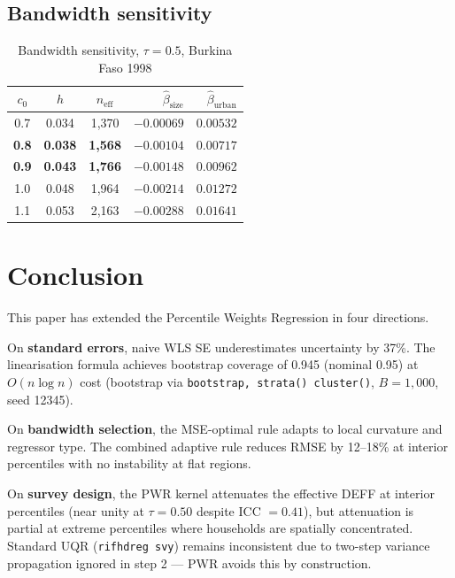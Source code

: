 \documentclass[12pt,a4paper]{article}
\theoremstyle{definition}
\begin{document}
\subsection{Bandwidth sensitivity}

\begin{table}[htbp]\centering\small
\caption{Bandwidth sensitivity, $\tau=0.5$, Burkina Faso 1998}
\label{tab:bw_sensitivity}
\begin{tabular}{cccrr}
\toprule
$c_0$ & $h$ & $n_{\mathrm{eff}}$ &
$\hat\beta_{\mathrm{size}}$ & $\hat\beta_{\mathrm{urban}}$\\\midrule
0.7&0.034&1{,}370&$-0.00069$&$0.00532$\\
\textbf{0.8}&\textbf{0.038}&\textbf{1{,}568}&$\mathbf{-0.00104}$&$\mathbf{0.00717}$\\
\textbf{0.9}&\textbf{0.043}&\textbf{1{,}766}
  &$\mathbf{-0.00148}$&$\mathbf{0.00962}$\\
1.0&0.048&1{,}964&$-0.00214$&$0.01272$\\
1.1&0.053&2{,}163&$-0.00288$&$0.01641$\\\bottomrule
\end{tabular}
\end{table}

\section{Conclusion}
\label{sec:conclusion}

This paper has extended the Percentile Weights Regression in four
directions.

On \textbf{standard errors}, naive WLS SE underestimates uncertainty
by 37\%. The linearisation formula achieves bootstrap coverage of
0.945 (nominal 0.95) at $O(n\log n)$ cost (bootstrap via \texttt{bootstrap, strata() cluster()}, $B=1{,}000$, seed 12345).

On \textbf{bandwidth selection}, the MSE-optimal rule adapts to local
curvature and regressor type. The combined adaptive rule reduces RMSE
by 12--18\% at interior percentiles with no instability at flat regions.

On \textbf{survey design}, the PWR kernel attenuates the effective
DEFF at interior percentiles (near unity at $\tau=0.50$ despite ICC
$=0.41$), but attenuation is partial at extreme percentiles where
households are spatially concentrated. Standard UQR (\texttt{rifhdreg
svy}) remains inconsistent due to two-step variance propagation ignored
in step 2 --- PWR avoids this by construction.
\end{document}
